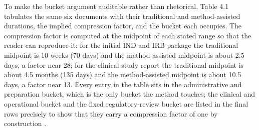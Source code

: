 
To make the bucket argument auditable rather than rhetorical, Table 4.1 tabulates
the same six documents with their traditional and method-assisted durations, the
implied compression factor, and the bucket each occupies. The compression factor is
computed at the midpoint of each stated range so that the reader can reproduce it:
for the initial IND and IRB package the traditional midpoint is 10 weeks (70 days)
and the method-assisted midpoint is about 2.5 days, a factor near 28; for the
clinical study report the traditional midpoint is about 4.5 months (135 days) and
the method-assisted midpoint is about 10.5 days, a factor near 13. Every entry in
the table sits in the administrative and preparation bucket, which is the only
bucket the method touches; the clinical and operational bucket and the fixed
regulatory-review bucket are listed in the final rows precisely to show that they
carry a compression factor of one by construction \cite{paipredict4x,paisitedocpk}.

